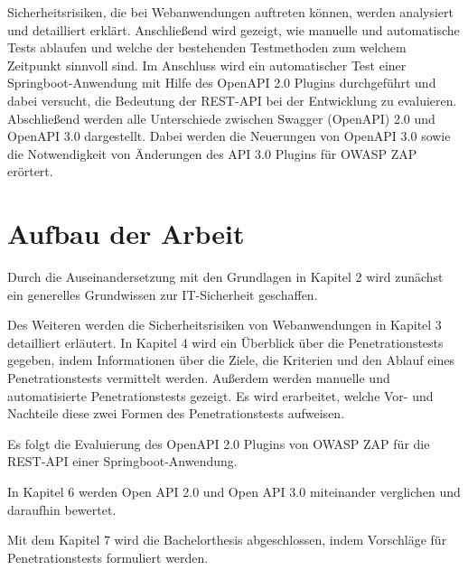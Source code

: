 Sicherheitsrisiken, die bei Webanwendungen auftreten können, werden analysiert und detailliert erklärt. Anschließend wird gezeigt, wie manuelle und automatische Tests ablaufen und welche der bestehenden Testmethoden zum welchem Zeitpunkt sinnvoll sind. Im Anschluss wird ein automatischer Test einer Springboot-Anwendung mit Hilfe des OpenAPI 2.0 Plugins durchgeführt und dabei versucht, die Bedeutung der REST-API bei der Entwicklung zu evaluieren. Abschließend werden alle Unterschiede zwischen Swagger (OpenAPI) 2.0 und OpenAPI 3.0 dargestellt. Dabei werden die Neuerungen von OpenAPI 3.0 sowie die Notwendigkeit von Änderungen des API 3.0 Plugins für OWASP ZAP erörtert.

\section{Aufbau der Arbeit}

Durch die Auseinandersetzung mit den Grundlagen in Kapitel 2 wird zunächst ein generelles Grundwissen zur IT-Sicherheit geschaffen.

Des Weiteren werden die Sicherheitsrisiken von Webanwendungen in Kapitel 3 detailliert erläutert. In Kapitel 4 wird ein Überblick über die Penetrationstests gegeben, indem Informationen über die Ziele, die Kriterien und den Ablauf eines Penetrationstests vermittelt werden. Außerdem werden manuelle und automatisierte Penetrationstests gezeigt. Es wird erarbeitet, welche Vor- und Nachteile diese zwei Formen des Penetrationstests aufweisen.

Es folgt die Evaluierung des OpenAPI 2.0 Plugins von OWASP ZAP für die REST-API einer Springboot-Anwendung.

In Kapitel 6 werden Open API 2.0 und Open API 3.0 miteinander verglichen und daraufhin bewertet.

Mit dem Kapitel 7 wird die Bachelorthesis abgeschlossen, indem Vorschläge für Penetrationstests formuliert werden.


